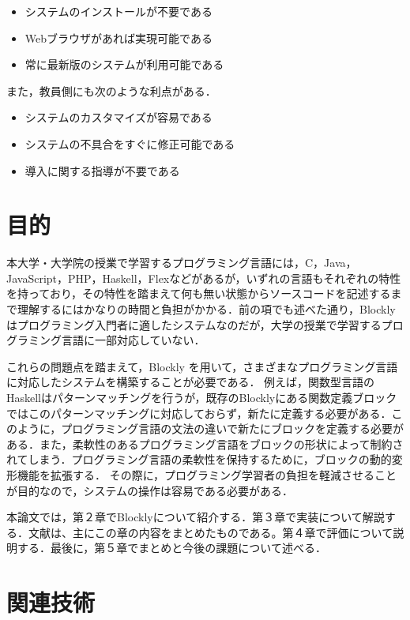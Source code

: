 \documentclass{risepaper}
\begin{document}
\begin{itemize}
\item システムのインストールが不要である
\item Webブラウザがあれば実現可能である
\item 常に最新版のシステムが利用可能である
\end{itemize} 

また，教員側にも次のような利点がある．

\begin{itemize}
\item システムのカスタマイズが容易である
\item システムの不具合をすぐに修正可能である
\item 導入に関する指導が不要である
\end{itemize} 
 
     \section{目的}

本大学・大学院の授業で学習するプログラミング言語には，C，Java，JavaScript，PHP，Haskell，Flexなどがあるが，いずれの言語もそれぞれの特性を持っており，その特性を踏まえて何も無い状態からソースコードを記述するまで理解するにはかなりの時間と負担がかかる．前の項でも述べた通り，Blocklyはプログラミング入門者に適したシステムなのだが，大学の授業で学習するプログラミング言語に一部対応していない．

これらの問題点を踏まえて，Blockly を用いて，さまざまなプログラミング言語に対応したシステムを構築することが必要である．
例えば，関数型言語のHaskellはパターンマッチングを行うが，既存のBlocklyにある関数定義ブロックではこのパターンマッチングに対応しておらず，新たに定義する必要がある．このように，プログラミング言語の文法の違いで新たにブロックを定義する必要がある．また，柔軟性のあるプログラミング言語をブロックの形状によって制約されてしまう．プログラミング言語の柔軟性を保持するために，ブロックの動的変形機能を拡張する．
その際に，プログラミング学習者の負担を軽減させることが目的なので，システムの操作は容易である必要がある．

本論文では，第２章でBlocklyについて紹介する．第３章で実装について解説する．文献\cite{icess}は、主にこの章の内容をまとめたものである。第４章で評価について説明する．最後に，第５章でまとめと今後の課題について述べる．
 	
 	\section{関連技術}
    
\end{document}
